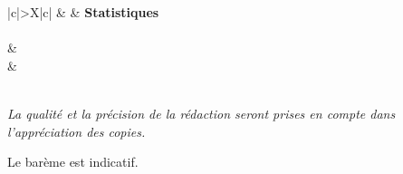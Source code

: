 \documentclass[10pt,french]{book}
\begin{document}


\begin{center}
\begin{tabularx}{\textwidth}{|c|>\centering X|c|}
	\iere {} &   & \textbf{Statistiques} \\
	\hline
		 \\
	\hline
         &  \\
		 &  \\
	\hline
         \\[1cm]
    \hline
\end{tabularx}\bigskip

{\itshape
La qualité et la précision de la rédaction seront prises en compte dans l'appréciation des copies.\par
Le barème est indicatif.}
\end{center}
\end{document}
